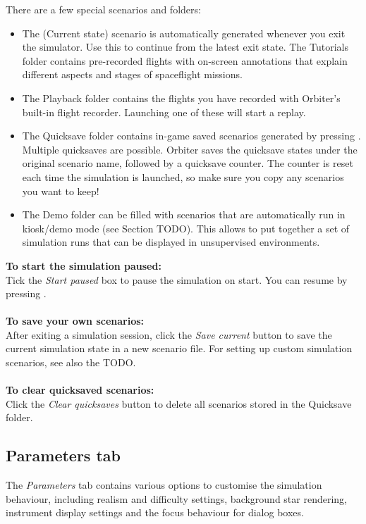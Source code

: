 \documentclass[Orbiter User Manual.tex]{subfiles}
\begin{document}
\begin{figure}[H]
	\centering
\end{figure}

\noindent
There are a few special scenarios and folders:

\begin{itemize}
\item The (Current state) scenario is automatically generated whenever you exit the simulator. Use this to continue from the latest exit state.
The Tutorials folder contains pre-recorded flights with on-screen annotations that explain different aspects and stages of spaceflight missions.
\item The Playback folder contains the flights you have recorded with Orbiter’s built-in flight recorder. Launching one of these will start a replay.
\item The Quicksave folder contains in-game saved scenarios generated by pressing \Ctrl{}. Multiple quicksaves are possible. Orbiter saves the quicksave states under the original scenario name, followed by a quicksave counter. The counter is reset each time the simulation is launched, so make sure you copy any scenarios you want to keep!
\item The Demo folder can be filled with scenarios that are automatically run in kiosk/demo mode (see Section TODO). This allows to put together a set of simulation runs that can be displayed in unsupervised environments.
\end{itemize}

\noindent
\textbf{To start the simulation paused:}\\
Tick the \textit{Start paused} box to pause the simulation on start. You can resume by pressing \Ctrl{}.\\
\\
\textbf{To save your own scenarios:}\\
After exiting a simulation session, click the \textit{Save current} button to save the current simulation state in a new scenario file. For setting up custom simulation scenarios, see also the TODO.\\
\\
\textbf{To clear quicksaved scenarios:}\\
Click the \textit{Clear quicksaves} button to delete all scenarios stored in the Quicksave folder.


\subsection{Parameters tab}
The \textit{Parameters} tab contains various options to customise the simulation behaviour, including realism and difficulty settings, background star rendering, instrument display settings and the focus behaviour for dialog boxes.
\end{document}
